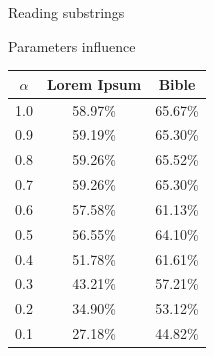 \documentclass[aspectratio=169]{beamer}
\begin{document}
\begin{frame}{Reading substrings}\centering
  
\end{frame}


\begin{frame}{Parameters influence}
 \begin{table}
    \centering
    \begin{tabular}{c || c  c}
      $\alpha$ & Lorem Ipsum & Bible \\\hline\hline
      1.0 & 58.97\% & 65.67\% \\\hline
      0.9 & 59.19\% & 65.30\% \\\hline
      0.8 & 59.26\% & 65.52\% \\\hline
      0.7 & 59.26\% & 65.30\% \\\hline
      0.6 & 57.58\% & 61.13\% \\\hline
      0.5 & 56.55\% & 64.10\% \\\hline
      0.4 & 51.78\% & 61.61\% \\\hline
      0.3 & 43.21\% & 57.21\% \\\hline
      0.2 & 34.90\% & 53.12\% \\\hline
      0.1 & 27.18\% & 44.82\%
    \end{tabular}
  \end{table}
\end{frame}
\end{document}
